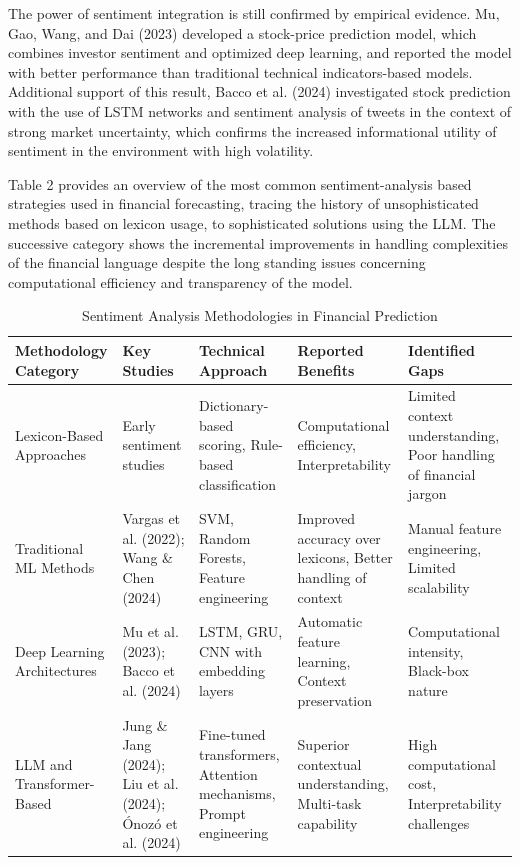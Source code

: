 \documentclass{singlecol-new}
\theoremstyle{TH}{
\newtheorem{lemma}{Lemma}
\newtheorem{theorem}[lemma]{Theorem}
\newtheorem{corrolary}[lemma]{Corrolary}
\newtheorem{conjecture}[lemma]{Conjecture}
\newtheorem{proposition}[lemma]{Proposition}
\newtheorem{claim}[lemma]{Claim}
\newtheorem{stheorem}[lemma]{Wrong Theorem}
\newtheorem{algorithm}{Algorithm}
}
\theoremstyle{THrm}{
\newtheorem{definition}{Definition}[section]
\newtheorem{question}{Question}[section]
\newtheorem{remark}{Remark}
\newtheorem{scheme}{Scheme}
}
\theoremstyle{THhit}{
\newtheorem{case}{Case}[section]
}
\begin{document}
The power of sentiment integration is still confirmed by empirical evidence. Mu, Gao, Wang, and Dai (2023) developed a stock-price prediction model, which combines investor sentiment and optimized deep learning, and reported the model with better performance than traditional technical indicators-based models. Additional support of this result, Bacco et al. (2024) investigated stock prediction with the use of LSTM networks and sentiment analysis of tweets in the context of strong market uncertainty, which confirms the increased informational utility of sentiment in the environment with high volatility.

Table 2 provides an overview of the most common sentiment-analysis based strategies used in financial forecasting, tracing the history of unsophisticated methods based on lexicon usage, to sophisticated solutions using the LLM. The successive category shows the incremental improvements in handling complexities of the financial language despite the long standing issues concerning computational efficiency and transparency of the model.


\begin{table}[!ht]
\centering
\caption{Sentiment Analysis Methodologies in Financial Prediction}
\label{tab:sentiment_methodologies}
\small
\begin{tabular}{p{2cm}p{2cm}p{2cm}p{2cm}p{2cm}}
\hline
\textbf{Methodology Category} & \textbf{Key Studies} & \textbf{Technical Approach} & \textbf{Reported Benefits} & \textbf{Identified Gaps} \\
\hline
Lexicon-Based Approaches & Early sentiment studies & Dictionary-based scoring, Rule-based classification & Computational efficiency, Interpretability & Limited context understanding, Poor handling of financial jargon \\
\hline
Traditional ML Methods & Vargas et al. (2022); Wang \& Chen (2024) & SVM, Random Forests, Feature engineering & Improved accuracy over lexicons, Better handling of context & Manual feature engineering, Limited scalability \\
\hline
Deep Learning Architectures & Mu et al. (2023); Bacco et al. (2024) & LSTM, GRU, CNN with embedding layers & Automatic feature learning, Context preservation & Computational intensity, Black-box nature \\
\hline
LLM and Transformer-Based & Jung \& Jang (2024); Liu et al. (2024); Ónozó et al. (2024) & Fine-tuned transformers, Attention mechanisms, Prompt engineering & Superior contextual understanding, Multi-task capability & High computational cost, Interpretability challenges \\
\hline
\end{tabular}
\end{table}
\end{document}
